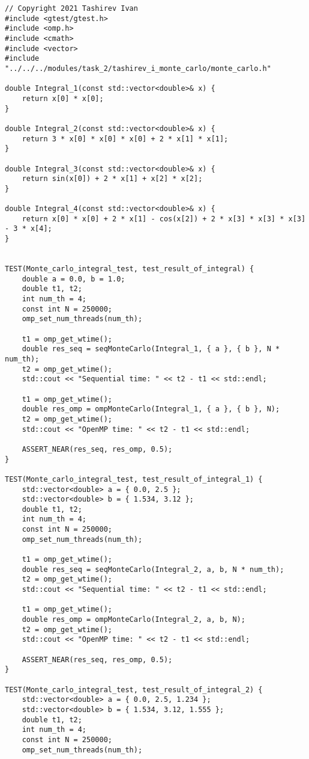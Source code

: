 \documentclass{report}
\begin{document}
\begin{lstlisting}
// Copyright 2021 Tashirev Ivan
#include <gtest/gtest.h>
#include <omp.h>
#include <cmath>
#include <vector>
#include "../../../modules/task_2/tashirev_i_monte_carlo/monte_carlo.h"

double Integral_1(const std::vector<double>& x) {
    return x[0] * x[0];
}

double Integral_2(const std::vector<double>& x) {
    return 3 * x[0] * x[0] * x[0] + 2 * x[1] * x[1];
}

double Integral_3(const std::vector<double>& x) {
    return sin(x[0]) + 2 * x[1] + x[2] * x[2];
}

double Integral_4(const std::vector<double>& x) {
    return x[0] * x[0] + 2 * x[1] - cos(x[2]) + 2 * x[3] * x[3] * x[3] - 3 * x[4];
}


TEST(Monte_carlo_integral_test, test_result_of_integral) {
    double a = 0.0, b = 1.0;
    double t1, t2;
    int num_th = 4;
    const int N = 250000;
    omp_set_num_threads(num_th);

    t1 = omp_get_wtime();
    double res_seq = seqMonteCarlo(Integral_1, { a }, { b }, N * num_th);
    t2 = omp_get_wtime();
    std::cout << "Sequential time: " << t2 - t1 << std::endl;

    t1 = omp_get_wtime();
    double res_omp = ompMonteCarlo(Integral_1, { a }, { b }, N);
    t2 = omp_get_wtime();
    std::cout << "OpenMP time: " << t2 - t1 << std::endl;

    ASSERT_NEAR(res_seq, res_omp, 0.5);
}

TEST(Monte_carlo_integral_test, test_result_of_integral_1) {
    std::vector<double> a = { 0.0, 2.5 };
    std::vector<double> b = { 1.534, 3.12 };
    double t1, t2;
    int num_th = 4;
    const int N = 250000;
    omp_set_num_threads(num_th);

    t1 = omp_get_wtime();
    double res_seq = seqMonteCarlo(Integral_2, a, b, N * num_th);
    t2 = omp_get_wtime();
    std::cout << "Sequential time: " << t2 - t1 << std::endl;

    t1 = omp_get_wtime();
    double res_omp = ompMonteCarlo(Integral_2, a, b, N);
    t2 = omp_get_wtime();
    std::cout << "OpenMP time: " << t2 - t1 << std::endl;

    ASSERT_NEAR(res_seq, res_omp, 0.5);
}

TEST(Monte_carlo_integral_test, test_result_of_integral_2) {
    std::vector<double> a = { 0.0, 2.5, 1.234 };
    std::vector<double> b = { 1.534, 3.12, 1.555 };
    double t1, t2;
    int num_th = 4;
    const int N = 250000;
    omp_set_num_threads(num_th);


\end{lstlisting}
\end{document}
